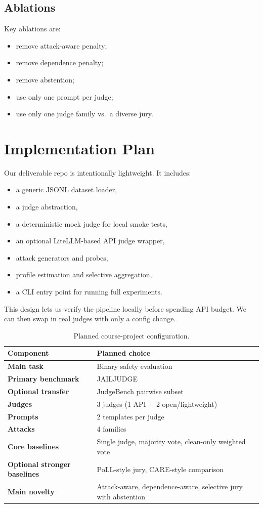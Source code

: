 \documentclass[11pt]{article}
\begin{document}
\subsection{Ablations}
Key ablations are:
\begin{itemize}
    \item remove attack-aware penalty;
    \item remove dependence penalty;
    \item remove abstention;
    \item use only one prompt per judge;
    \item use only one judge family vs.\ a diverse jury.
\end{itemize}

\section{Implementation Plan}
Our deliverable repo is intentionally lightweight. It includes:
\begin{itemize}
    \item a generic JSONL dataset loader,
    \item a judge abstraction,
    \item a deterministic mock judge for local smoke tests,
    \item an optional LiteLLM-based API judge wrapper,
    \item attack generators and probes,
    \item profile estimation and selective aggregation,
    \item a CLI entry point for running full experiments.
\end{itemize}

This design lets us verify the pipeline locally before spending API budget. We can then swap in real judges with only a config change.

\begin{table}[t]
\centering
\small
\caption{Planned course-project configuration.}
\begin{tabularx}{\linewidth}{@{}>{\bfseries}lX@{}}
\toprule
Component & Planned choice \\
\midrule
Main task & Binary safety evaluation \\
Primary benchmark & JAILJUDGE \\
Optional transfer & JudgeBench pairwise subset \\
Judges & 3 judges (1 API + 2 open/lightweight) \\
Prompts & 2 templates per judge \\
Attacks & 4 families \\
Core baselines & Single judge, majority vote, clean-only weighted vote \\
Optional stronger baselines & PoLL-style jury, CARE-style comparison \\
Main novelty & Attack-aware, dependence-aware, selective jury with abstention \\
\bottomrule
\end{tabularx}
\end{table}
\end{document}
